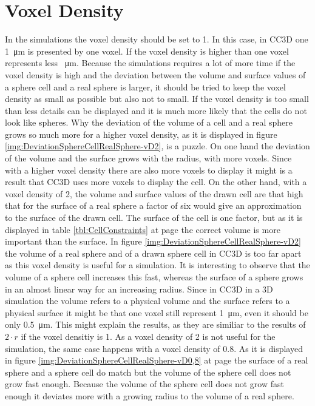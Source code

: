 \section{Voxel Density}\label{sec:vD}
In the simulations the voxel density should be set to 1. In this case, in \ac{CC3D} one \SI{1}{\micro\metre} is presented by one voxel. If the voxel density is higher than one voxel represents less \SI{}{\micro\metre}. Because the simulations requires a lot of more time if the voxel density is high and the deviation between the volume and surface values of a sphere cell and a real sphere is larger, it should be tried to keep the voxel density as small as possible but also not to small. If the voxel density is too small than less details can be displayed and it is much more likely that the cells do not look like spheres. Why the deviation of the volume of a cell and a real sphere grows so much more for a higher voxel density, as it is displayed in figure \ref{img:DeviationSphereCellRealSphere-vD2}, is a puzzle. \newline
On one hand the deviation of the volume and the surface grows with the radius, with more voxels. Since with a higher voxel density there are also more voxels to display it might is a result that \ac{CC3D} uses more voxels to display the cell. On the other hand, with a voxel density of 2, the volume and surface values of the drawn cell are that high that for the surface of a real sphere a factor of six would give an approximation to the surface of the drawn cell. \newline
The surface of the cell is one factor, but as it is displayed in table \ref{tbl:CellConstraints} at page \pageref{tbl:CellConstraints} the correct volume is more important than the surface. In figure \ref{img:DeviationSphereCellRealSphere-vD2} the volume of a real sphere and of a drawn sphere cell in \ac{CC3D} is too far apart as this voxel density is useful for a simulation. It is interesting to observe that the volume of a sphere cell increases this fast, whereas the surface of a sphere grows in an almost linear way for an increasing radius. Since in \ac{CC3D} in a 3D simulation the volume refers to a physical volume and the surface refers to a physical surface it might be that one voxel still represent \SI{1}{\micro\metre}, even it should be only \SI{0.5}{\micro\metre}. This might explain the results, as they are similiar to the results of $2 \cdot r$ if the voxel densitiy is 1. \newline
As a voxel density of 2 is not useful for the simulation, the same case happens with a voxel density of 0.8. As it is displayed in figure \ref{img:DeviationSphereCellRealSphere-vD0,8} at page \pageref{img:DeviationSphereCellRealSphere-vD0,8} the surface of a real sphere and a sphere cell do match but the volume of the sphere cell does not grow fast enough. Because the volume of the sphere cell does not grow fast enough it deviates more with a growing radius to the volume of a real sphere. \newline
